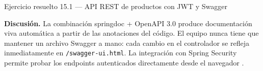 \documentclass[11pt,a4paper,openany]{book}
\begin{document}
\begin{cajaejemplo}{Ejercicio resuelto 15.1 --- API REST de productos con JWT y Swagger}
\begin{center}
\end{center}

\textbf{Discusión.} La combinación springdoc + OpenAPI 3.0 produce
documentación viva automática a partir de las anotaciones del código.
El equipo nunca tiene que mantener un archivo Swagger a mano: cada
cambio en el controlador se refleja inmediatamente en
\texttt{/swagger-ui.html}. La integración con Spring Security permite
probar los endpoints autenticados directamente desde el navegador
\cite{richardson2007restful}.
\end{cajaejemplo}
\end{document}
